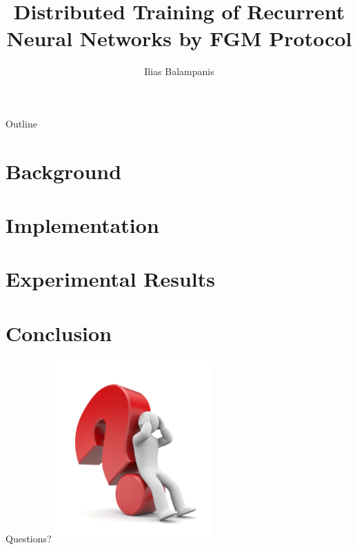 \documentclass{beamer}
\title[Diploma Thesis Presentation]{Distributed Training of Recurrent Neural Networks by FGM Protocol}
\author{Ilias Balampanis}
\institute[TUC]{ %
School of Electrical and Computer Engineering \\
Technical University of Crete}
\begin{document}
    \begin{frame}
        \titlepage
    \end{frame}

    \begin{frame}{Outline}
        \tableofcontents
    \end{frame}

    \section{Background}\label{sec:background}
    

    \section{Implementation}\label{sec:implementation}
    

    \section{Experimental Results}\label{sec:experimental-results}
    

    \section{Conclusion}\label{sec:conclusion}
    

    \begin{frame}{Questions?}
        \centering
        \includegraphics[width=6cm,height=7cm]{images/question-mark.png}
    \end{frame}
\end{document}
